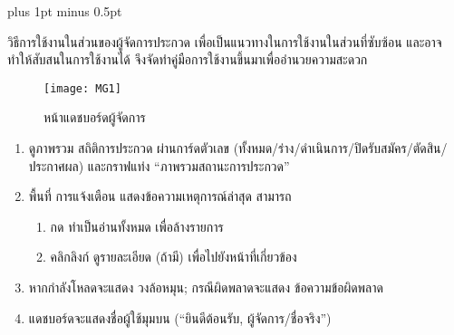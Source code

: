
\clearpage
\thispagestyle{plain}

\begingroup
\fontsize{16pt}{19.2pt}\selectfont
\justifying
\XeTeXlinebreakskip=0pt plus 1pt minus 0.5pt
\setlength{\parindent}{1.5cm}
\setlength{\parskip}{0pt}

\indent วิธีการใช้งานในส่วนของผู้จัดการประกวด เพื่อเป็นแนวทางในการใช้งานในส่วนที่ซับซ้อน และอาจทำให้สับสนในการใช้งานได้ จึงจัดทำคู่มือการใช้งานขึ้นมาเพื่ออำนวยความสะดวก

\vspace{\baselineskip}

\begin{figure}[h]
	\centering
	\texttt{[image: MG1]}
	\caption{หน้าแดชบอร์ดผู้จัดการ}
\end{figure}

\par

\begin{sloppypar}
	\begin{enumerate}
		\item ดูภาพรวม สถิติการประกวด ผ่านการ์ดตัวเลข (ทั้งหมด/ร่าง/ดำเนินการ/ปิดรับสมัคร/ตัดสิน/ประกาศผล) และกราฟแท่ง “ภาพรวมสถานะการประกวด”
		\item พื้นที่ การแจ้งเตือน แสดงข้อความเหตุการณ์ล่าสุด สามารถ
		\begin{enumerate}
			\item กด ทำเป็นอ่านทั้งหมด เพื่อล้างรายการ
			\item คลิกลิงก์ ดูรายละเอียด (ถ้ามี) เพื่อไปยังหน้าที่เกี่ยวข้อง
		\end{enumerate}
		\item หากกำลังโหลดจะแสดง วงล้อหมุน; กรณีผิดพลาดจะแสดง ข้อความข้อผิดพลาด
		\item แดชบอร์ดจะแสดงชื่อผู้ใช้มุมบน (“ยินดีต้อนรับ, ผู้จัดการ/ชื่อจริง”)
	\end{enumerate}
\end{sloppypar}

\par

